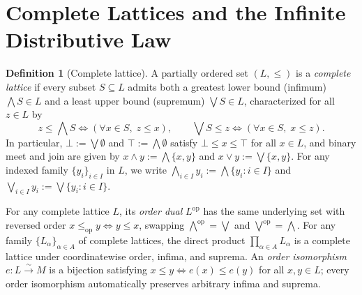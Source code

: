 \documentclass[11pt,a4paper]{article}
\theoremstyle{plain}
\theoremstyle{definition}
\newtheorem{definition}[theorem]{Definition}
\newcommand{\op}{\mathrm{op}}
\begin{document}
\section{Complete Lattices and the Infinite Distributive Law}

\begin{definition}[Complete lattice]
\label{def:complete-lattice}
A partially ordered set $(L, \le)$ is a \emph{complete lattice} if every subset
$S \subseteq L$ admits both a greatest lower bound (infimum) $\bigwedge S \in L$ and a
least upper bound (supremum) $\bigvee S \in L$, characterized for all $z \in L$ by
\[
  z \le \bigwedge S \iff (\forall x \in S,\; z \le x),
  \qquad
  \bigvee S \le z \iff (\forall x \in S,\; x \le z).
\]
In particular, $\bot := \bigvee \emptyset$ and $\top := \bigwedge \emptyset$ satisfy
$\bot \le x \le \top$ for all $x \in L$, and binary meet and join are given by
$x \wedge y := \bigwedge \{x, y\}$ and $x \vee y := \bigvee \{x, y\}$. For any indexed
family $\{y_i\}_{i \in I}$ in $L$, we write $\bigwedge_{i \in I} y_i := \bigwedge \{y_i : i \in I\}$
and $\bigvee_{i \in I} y_i := \bigvee \{y_i : i \in I\}$.
\end{definition}

For any complete lattice $L$, its \emph{order dual} $L^{\op}$ has the same underlying set
with reversed order $x \le_{\op} y \iff y \le x$, swapping $\bigwedge^{\op} = \bigvee$
and $\bigvee^{\op} = \bigwedge$. For any family $\{L_\alpha\}_{\alpha \in A}$ of complete
lattices, the direct product $\prod_{\alpha \in A} L_\alpha$ is a complete lattice under
coordinatewise order, infima, and suprema. An \emph{order isomorphism} $e : L \xrightarrow{\sim} M$
is a bijection satisfying $x \le y \iff e(x) \le e(y)$ for all $x, y \in L$; every order
isomorphism automatically preserves arbitrary infima and suprema.
\end{document}
